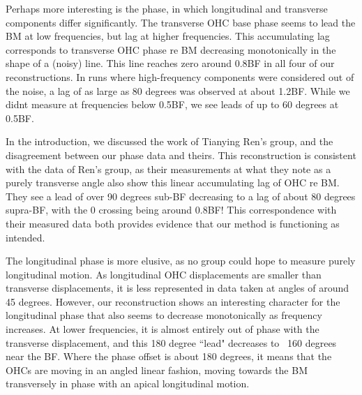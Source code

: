 \documentclass{article}
\begin{document}
\par{Perhaps more interesting is the phase, in which longitudinal and transverse components differ significantly. The transverse OHC base phase seems to lead the BM at low frequencies, but lag at higher frequencies. This accumulating lag corresponds to transverse OHC phase re BM decreasing monotonically in the shape of a (noisy) line. This line reaches zero around 0.8BF in all four of our reconstructions. In runs where high-frequency components were considered out of the noise, a lag of as large as 80 degrees was observed at about 1.2BF. While we didnt measure at frequencies below 0.5BF, we see leads of up to 60 degrees at 0.5BF.} 
\par{In the introduction, we discussed the work of Tianying Ren's group, and the disagreement between our phase data and theirs. This reconstruction is consistent with the data of Ren's group, as their measurements at what they note as a purely transverse angle also show this linear accumulating lag of OHC re BM. They see a lead of over 90 degrees sub-BF decreasing to a lag of about 80 degrees supra-BF, with the 0 crossing being around 0.8BF! This correspondence with their measured data both provides evidence that our method is functioning as intended.}
\par{The longitudinal phase is more elusive, as no group could hope to measure purely longitudinal motion. As longitudinal OHC displacements are smaller than transverse displacements, it is less represented in data taken at angles of around 45 degrees. However, our reconstruction shows an interesting character for the longitudinal phase that also seems to decrease monotonically as frequency increases. At lower frequencies, it is almost entirely out of phase with the transverse displacement, and this 180 degree ``lead" decreases to ~160 degrees near the BF. Where the phase offset is about 180 degrees, it means that the OHCs are moving in an angled linear fashion, moving towards the BM transversely in phase with an apical longitudinal motion.}
\end{document}
